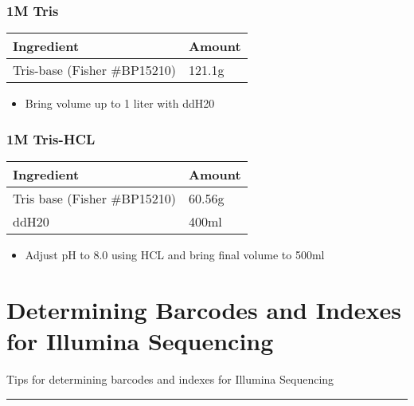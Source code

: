 \documentclass[
  letterpaper,
  DIV=11,
  numbers=noendperiod]{scrreprt}
\providecommand{\tightlist}{%
  \setlength{\itemsep}{0pt}\setlength{\parskip}{0pt}}\usepackage{longtable,booktabs,array}
\begin{document}
\hypertarget{m-tris}{%
\subsection*{\texorpdfstring{\textbf{1M Tris}}{1M Tris}}\label{m-tris}}

\begin{longtable}[]{@{}ll@{}}
\toprule()
\textbf{Ingredient} & \textbf{Amount} \\
\midrule()
\endhead
Tris-base (Fisher \#BP15210) & 121.1g \\
\bottomrule()
\end{longtable}

\begin{itemize}
\tightlist
\item
  Bring volume up to 1 liter with ddH20
\end{itemize}

\hypertarget{m-tris-hcl}{%
\subsection*{\texorpdfstring{\textbf{1M
Tris-HCL}}{1M Tris-HCL}}\label{m-tris-hcl}}

\begin{longtable}[]{@{}ll@{}}
\toprule()
\textbf{Ingredient} & \textbf{Amount} \\
\midrule()
\endhead
Tris base (Fisher \#BP15210) & 60.56g \\
ddH20 & 400ml \\
\bottomrule()
\end{longtable}

\begin{itemize}
\tightlist
\item
  Adjust pH to 8.0 using HCL and bring final volume to 500ml\\
\end{itemize}

\hypertarget{determining-barcodes-and-indexes-for-illumina-sequencing}{%
\chapter{Determining Barcodes and Indexes for Illumina
Sequencing}\label{determining-barcodes-and-indexes-for-illumina-sequencing}}

Tips for determining barcodes and indexes for Illumina Sequencing

\begin{center}\rule{0.5\linewidth}{0.5pt}\end{center}
\end{document}
